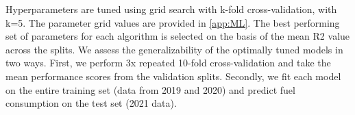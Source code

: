 Hyperparameters are tuned using grid search with k-fold cross-validation, with k=5. The parameter grid values are provided in \autoref{app:ML}. The best performing set of parameters for each algorithm is selected on the basis of the mean \ac{R2} value across the splits.
We assess the generalizability of the optimally tuned models in two ways. First, we perform 3x repeated 10-fold cross-validation and take the mean performance scores from the validation splits. Secondly, we fit each model on the entire training set (data from 2019 and 2020) and predict fuel consumption on the test set (2021 data).

